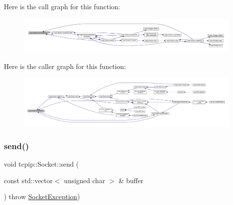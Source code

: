 Here is the call graph for this function\+:
\nopagebreak
\begin{figure}[H]
\begin{center}
\leavevmode
\includegraphics[width=350pt]{classtcpip_1_1_socket_a30a24c05b20d9c3ec54239e75268cda8_cgraph}
\end{center}
\end{figure}
Here is the caller graph for this function\+:
\nopagebreak
\begin{figure}[H]
\begin{center}
\leavevmode
\includegraphics[width=350pt]{classtcpip_1_1_socket_a30a24c05b20d9c3ec54239e75268cda8_icgraph}
\end{center}
\end{figure}
\mbox{\label{classtcpip_1_1_socket_acb91f20e7a532159a8daa2796fa4abd4}} 
\subsubsection{\texorpdfstring{send()}{send()}}
{\footnotesize\ttfamily void tcpip\+::\+Socket\+::send (\begin{DoxyParamCaption}\item[{const std\+::vector$<$ unsigned char $>$ \&}]{buffer }\end{DoxyParamCaption}) throw  \hyperlink{classtcpip_1_1_socket_exception}{Socket\+Exception}) }

